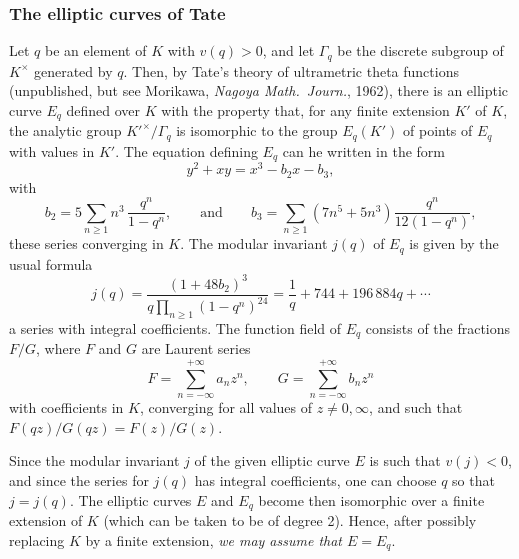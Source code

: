 \begin{subappendices}
\subsubsection{The elliptic curves of Tate}
\label{sec:IV_A11}
Let $q$ be an element of $K$ with $v(q) > 0$, and let $\Gamma_q$ be the
discrete subgroup of $K^\times$ generated by $q$. Then, by Tate's theory of
ultrametric theta functions (unpublished, but see Morikawa, \emph{Nagoya Math.\
Journ.}, 1962),
\dpage
there is an elliptic curve $E_q$ defined over $K$
with the property that, for any finite extension $K'$ of $K$, the analytic
group ${K'}^\times / \Gamma_q$ is isomorphic to the group $E_q(K')$ of points
of $E_q$ with values in $K'$. The equation defining $E_q$ can he written in the
form
\[
	y^2 + xy = x^3 - b_2x - b_3,
\]
with
\[
	b_2 = 5 \sum_{n\ge 1} n^3 \, \frac{q^n}{1-q^n}, \qquad \text{and}
	\qquad b_3 = \sum_{n\ge 1} (7n^5 + 5n^3) \frac{q^n}{12(1-q^n)},
\]
these series converging in $K$. The modular invariant $j(q)$ of $E_q$ is
given by the usual formula
\[
	j(q) = \frac{(1 + 48b_2)^3}{q \prod_{n\ge 1} (1 - q^n)^{24}}
	= \frac{1}{q} + 744 + 196\,884 q + \cdots
\]
a series with integral coefficients. The function field of $E_q$ consists
of the fractions $F/G$, where $F$ and $G$ are Laurent series
\[
	F = \sum_{n=-\infty}^{+\infty} a_n z^n, \qquad
	G = \sum_{n=-\infty}^{+\infty} b_n z^n
\]
with coefficients in $K$, converging for all values of $z \ne 0, \infty$, and
such that $F(qz)/G(qz) = F(z)/G(z)$.

Since the modular invariant $j$ of the given elliptic curve $E$
is such that $v(j) < 0$, and since the series for $j(q)$ has integral
coefficients, one can choose $q$ so that $j = j(q)$. The elliptic curves
$E$ and $E_q$ become then isomorphic over a finite extension of $K$
(which can be taken to be of degree 2). Hence, after possibly 
replacing $K$ by a finite extension, \emph{we may assume that $E = E_q$}.


\end{subappendices}
